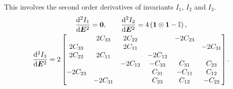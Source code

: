 This involves the second order derivatives of invariants $I_1$, $I_2$ and $I_3$.
\begin{gather}
\dfrac{\mathrm{d}^2I_1}{\mathrm{d}\bm{E}^2}=\bm{0},\qquad
\dfrac{\mathrm{d}^2I_2}{\mathrm{d}\bm{E}^2}=4\left(\bm{1}\otimes\bm{1}-\mathbb{I}\right),\\
\begin{split}
\dfrac{\mathrm{d}^2I_3}{\mathrm{d}\bm{E}^2}=2\begin{bmatrix}
             & 2C_{33}  & 2C_{22}  &          & -2C_{23} &          \\
    2C_{33}  &          & 2C_{11}  &          &          & -2C_{31} \\
    2C_{22}  & 2C_{11}  &          & -2C_{12} &          &          \\
             &          & -2C_{12} & -C_{33}  & C_{31}   & C_{23}   \\
    -2C_{23} &          &          & C_{31}   & -C_{11}  & C_{12}   \\
             & -2C_{31} &          & C_{23}   & C_{12}   & -C_{22}
\end{bmatrix}.
\end{split}
\end{gather}

